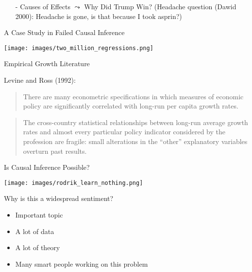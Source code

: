 \documentclass{beamer}
\numberwithin{equation}{section}
\begin{document}
\begin{frame}

\begin{itemize}
\item[-] Causes of Effects $\leadsto$ Why Did Trump Win?   (Headache question (Dawid 2000): Headache is gone, is that because I took asprin?) \pause 

\end{itemize}  


\end{frame}



\begin{frame}{A Case Study in Failed Causal Inference}

\begin{center}
\texttt{[image: images/two\_million\_regressions.png]}
\end{center}

\end{frame}

\begin{frame}{Empirical Growth Literature}

Levine and Ross (1992):

\begin{quote}
There are many econometric specifications in which measures of economic
policy are significantly correlated with long-run per capita growth
rates.
\end{quote}

\pause

\begin{quote}
The cross-country statistical relationships between long-run average
growth rates and almost every particular policy indicator considered by
the profession are fragile: small alterations in the ``other''
explanatory variables overturn past results.
\end{quote}

\end{frame}

\begin{frame}{Is Causal Inference Possible?}

\texttt{[image: images/rodrik\_learn\_nothing.png]}

\pause

Why is this a widespread sentiment?

\begin{itemize}
\itemsep1pt\parskip0pt
\item Important topic
\item
  A lot of data
\item
  A lot of theory
\item
  Many smart people working on this problem
\end{itemize}

\end{frame}
\end{document}
